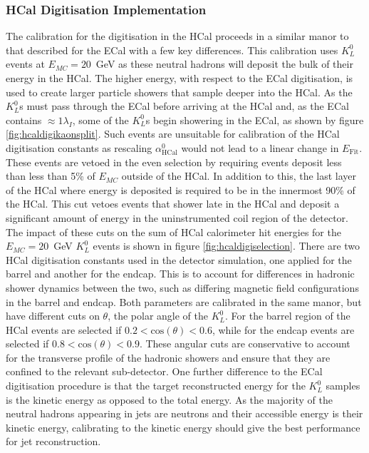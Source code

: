 
\subsubsection{HCal Digitisation Implementation}
\label{sec:hcaldigi}
The calibration for the digitisation in the HCal proceeds in a similar manor to that described for the ECal with a few key differences.  This calibration uses $K^{0}_{L}$ events at $E_{MC} = 20$~GeV as these neutral hadrons will deposit the bulk of their energy in the HCal.  The higher energy, with respect to the ECal digitisation, is used to create larger particle showers that sample deeper into the HCal.  As the $K^{0}_{L}$s must pass through the ECal before arriving at the HCal and, as the ECal contains $\approx 1 \lambda_{I}$, some of the $K^{0}_{L}$s begin showering in the ECal, as shown by figure \ref{fig:hcaldigikaonsplit}.  Such events are unsuitable for calibration of the HCal digitisation constants as rescaling $\alpha^{0}_{\text{HCal}}$ would not lead to a linear change in $E_{\text{Fit}}$.  These events are vetoed in the even selection by requiring events deposit less than less than 5\% of $E_{MC}$ outside of the HCal.  In addition to this, the last layer of the HCal where energy is deposited is required to be in the innermost 90\% of the HCal.  This cut vetoes events that shower late in the HCal and deposit a significant amount of energy in the uninstrumented coil region of the detector.  The impact of these cuts on the sum of HCal calorimeter hit energies for the $E_{MC} = 20$~GeV $K^{0}_{L}$ events is shown in figure \ref{fig:hcaldigiselection}.  There are two HCal digitisation constants used in the detector simulation, one applied for the barrel and another for the endcap.  This is to account for differences in hadronic shower dynamics between the two, such as differing magnetic field configurations in the barrel and endcap.  Both parameters are calibrated in the same manor, but have different cuts on $\theta$, the polar angle of the $K^{0}_{L}$.  For the barrel region of the HCal events are selected if $0.2 < \text{cos}(\theta) < 0.6$, while for the endcap events are selected if $0.8 < \text{cos}(\theta) < 0.9$.  These angular cuts are conservative to account for the transverse profile of the hadronic showers and ensure that they are confined to the relevant sub-detector.  One further difference to the ECal digitisation procedure is that the target reconstructed energy for the $K^{0}_{L}$ samples is the kinetic energy as opposed to the total energy.  As the majority of the neutral hadrons appearing in jets are neutrons and their accessible energy is their kinetic energy, calibrating to the kinetic energy should give the best performance for jet reconstruction.  

